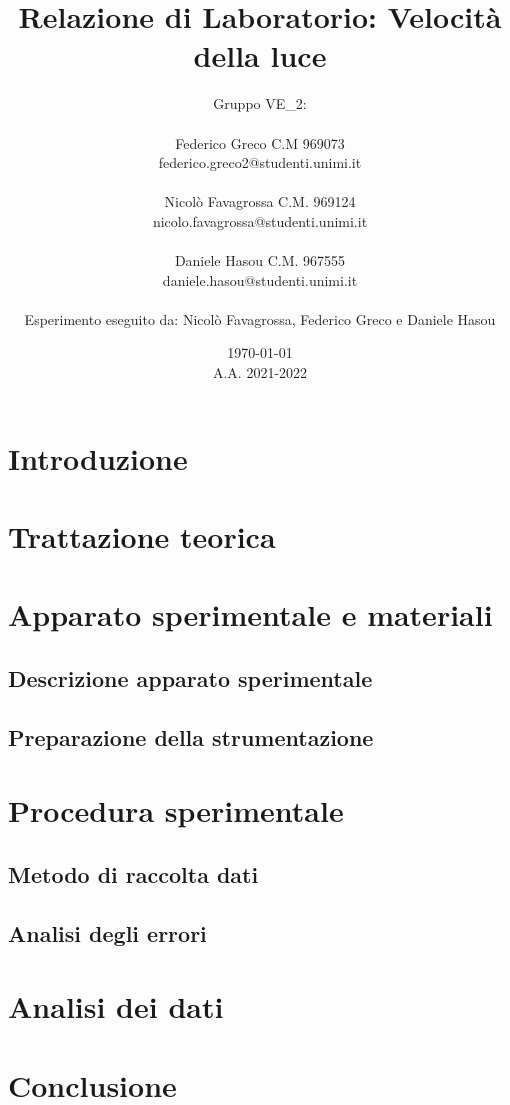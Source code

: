 \documentclass{article}
\title{Relazione di Laboratorio: Velocità della luce}
\author{Gruppo VE\_2:\\ \\Federico Greco C.M 969073\\federico.greco2@studenti.unimi.it\\ \\ Nicolò Favagrossa C.M. 969124\\nicolo.favagrossa@studenti.unimi.it\\ \\Daniele Hasou C.M. 967555\\daniele.hasou@studenti.unimi.it \\ \\ Esperimento eseguito da: Nicolò Favagrossa, Federico Greco e Daniele Hasou}
\date{\today\\A.A. 2021-2022}
\begin{document}
\maketitle
\newpage
\tableofcontents
\newpage
\section{Introduzione}

\newpage
\section{Trattazione teorica}

\section{Apparato sperimentale e materiali}
\subsection{Descrizione apparato sperimentale}


\subsection{Preparazione della strumentazione}

\section{Procedura sperimentale}

\subsection{Metodo di raccolta dati}

\subsection{Analisi degli errori}

\section{Analisi dei dati}

\section{Conclusione}

\appendix
\end{document}
